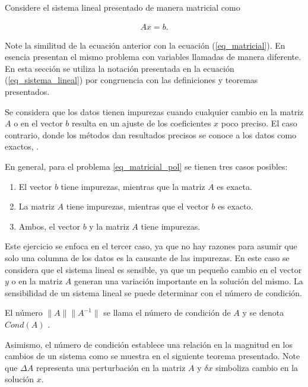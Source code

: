 Considere el sistema lineal presentado de manera matricial como 

\begin{equation}  \label{eq_sistema_lineal}
	\begin{aligned}
		Ax = b.
	\end{aligned}
\end{equation} 

Note la similitud de la ecuación anterior con la ecuación (\ref{eq_matricial}). En esencia presentan el mismo problema con variables llamadas de manera diferente. En esta sección se utiliza la notación presentada en la ecuación (\ref{eq_sistema_lineal}) por congruencia con las definiciones y teoremas presentados. 

Se considera que los datos tienen impurezas cuando cualquier cambio en la matriz $A$ o en el vector $b$ resulta en un ajuste de los coeficientes $x$ poco preciso. El caso contrario, donde los métodos dan resultados precisos se conoce a los datos como exactos, \cite{numerical_linear_algebra}.

En general, para el problema \ref{eq_matricial_pol} se tienen tres casos posibles: 
\begin{enumerate}
	\item El vector $b$ tiene impurezas, mientras que la matriz $A$ es exacta. 
	\item La matriz $A$ tiene impurezas, mientras que el vector $b$ es exacto.
	\item Ambos, el vector $b$ y la matriz $A$ tiene impurezas. 
\end{enumerate}

Este ejercicio se enfoca en el tercer caso, ya que no hay razones para asumir que solo una columna de los datos es la causante de las impurezas. En este caso se considera que el sistema lineal es sensible, ya que un pequeño cambio en el vector $y$ o en la matriz $A$ generan una variación importante en la solución del mismo. La sensibilidad de un sistema lineal se puede determinar con el número de condición. 

\begin{definition}
	El número $\parallel A \parallel  \parallel A^{-1} \parallel$ se llama el número de condición de $A$ y se denota $Cond(A)$ \cite[p.~62]{numerical_linear_algebra}. 
\end{definition}

Asimismo, el número de condición establece una relación en la magnitud en los cambios de un sistema como se muestra en el siguiente teorema presentado. Note que $\Delta A$ representa una perturbación en la matriz $A$ y $\delta x$ simboliza cambio en la solución $x$. 


